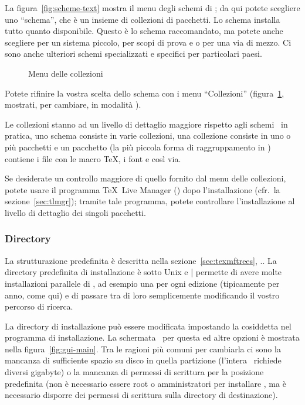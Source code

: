 \documentclass{article}
\begin{document}
La figura~\ref{fig:scheme-text} mostra il menu degli schemi di \TL; da qui
potete scegliere uno ``schema'', che è un insieme di collezioni di pacchetti.
Lo schema  installa tutto quanto disponibile.
Questo è lo schema raccomandato, ma potete anche scegliere 
per un sistema piccolo,  per scopi di prova e
 o  per una via di mezzo. Ci sono anche
ulteriori schemi specializzati e specifici per particolari paesi.

\begin{figure}[tbh]
\centering {}
\caption{Menu delle collezioni}\label{fig:collections-gui}
\end{figure}

Potete rifinire la vostra scelta dello schema con i menu ``Collezioni''
(figura~\ref{fig:collections-gui}, mostrati, per cambiare, in modalità \GUI).

Le collezioni stanno ad un livello di dettaglio maggiore rispetto agli
schemi \Dash\ in pratica, uno schema consiste in varie collezioni, una
collezione consiste in uno o più pacchetti e un pacchetto (la più piccola
forma di raggruppamento in \TL) contiene i file con le macro \TeX, i font
e così via.

Se desiderate un controllo maggiore di quello fornito dal menu delle
collezioni, potete usare il programma \TeX\ Live Manager ()
dopo l'installazione (cfr.\ la sezione~\ref{sec:tlmgr}); tramite tale
programma, potete controllare l'installazione al livello di dettaglio dei
singoli pacchetti.

\subsubsection{Directory}
\label{sec:directories}

La strutturazione predefinita è descritta nella
sezione~\ref{sec:texmftrees}, \p.\pageref{sec:texmftrees}. La directory
predefinita di installazione è
 sotto
Unix e |%
permette di avere molte installazioni parallele di \TL, ad esempio una per
ogni edizione (tipicamente per anno, come qui) e di passare tra di loro
semplicemente modificando il vostro percorso di ricerca.

La directory di installazione può essere modificata impostando la
cosiddetta  nel programma di installazione. La schermata
\GUI\ per questa ed altre opzioni è mostrata nella
figura~\ref{fig:gui-main}. Tra le ragioni più comuni per cambiarla ci sono
la mancanza di sufficiente spazio su disco in quella partizione (l'intera
\TL\ richiede diversi gigabyte) o la mancanza di permessi di scrittura per
la posizione predefinita (non è necessario essere root o amministratori
per installare \TL, ma è necessario disporre dei permessi di scrittura sulla
directory di destinazione).
\end{document}
